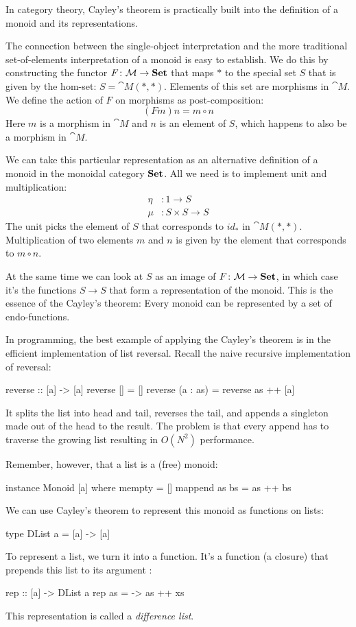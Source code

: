 \documentclass[DaoFP]{subfiles}
\begin{document}
In category theory, Cayley's theorem is practically built into the definition of a monoid and its representations. 

The connection between the single-object interpretation and the more traditional set-of-elements interpretation of a monoid is easy to establish. We do this by constructing the functor $F \colon \mathcal{M} \to \mathbf{Set}$ that maps $*$ to the special set $S$ that is given by the hom-set: $S = \cat M(*, *)$. Elements of this set are morphisms in $\cat M$. We define the action of $F$ on morphisms as post-composition:
\[ (F m) n = m \circ n \]
Here $m$ is a morphism in $\cat M$ and $n$ is an element of $S$, which happens to also be a morphism in $\cat M$.

We can take this particular representation as an alternative definition of a monoid in the monoidal category $\mathbf{Set}$. All we need is to implement unit and multiplication:
\begin{align*}
\eta &\colon 1 \to S
\\
\mu &\colon S \times S \to S
\end{align*}
The unit picks the element of $S$ that corresponds to $id_*$ in $\cat M(*, *)$. Multiplication of two elements $m$ and $n$ is given by the element that corresponds to $m \circ n$. 

At the same time we can look at $S$ as an image of $F \colon \mathcal{M} \to \mathbf{Set}$, in which case it's the functions $S \to S$ that form a representation of the monoid. This is the essence of the Cayley's theorem: Every monoid can be represented by a set of endo-functions.

In programming, the best example of applying the Cayley's theorem is in the efficient implementation of list reversal. Recall the naive recursive implementation of reversal:
\begin{haskell}
reverse :: [a] -> [a]
reverse [] = []
reverse (a : as) = reverse as ++ [a]
\end{haskell}
It splits the list into head and tail, reverses the tail, and appends a singleton made out of the head to the result. The problem is that every append has to traverse the growing list resulting in $O(N^2)$ performance.

Remember, however, that a list is a (free) monoid:
\begin{haskell}
instance Monoid [a] where
  mempty = []
  mappend as bs = as ++ bs
\end{haskell}
We can use Cayley's theorem to represent this monoid as functions on lists:
\begin{haskell}
type DList a = [a] -> [a]
\end{haskell}
To represent a list, we turn it into a function. It's a function (a closure) that prepends this list  to its argument :
\begin{haskell}
rep :: [a] -> DList a
rep as = \xs -> as ++ xs
\end{haskell}
This representation is called a \emph{difference list}.
\end{document}
